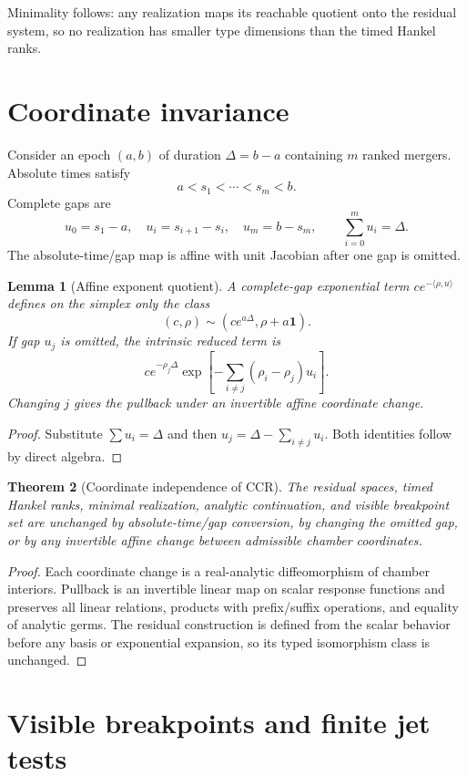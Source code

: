 \documentclass[11pt]{article}
\newtheorem{theorem}{Theorem}[section]
\newtheorem{lemma}[theorem]{Lemma}
\newcommand{\one}{\mathbf 1}
\begin{document}
Minimality follows: any realization maps its reachable quotient onto the residual system, so no realization has smaller type dimensions than the timed Hankel ranks.

\section{Coordinate invariance}

Consider an epoch $(a,b)$ of duration $\Delta=b-a$ containing $m$ ranked mergers.  Absolute times satisfy
\[
a<s_1<\cdots<s_m<b.
\]
Complete gaps are
\[
u_0=s_1-a,\quad u_i=s_{i+1}-s_i,\quad u_m=b-s_m,
\qquad \sum_{i=0}^m u_i=\Delta.
\]
The absolute-time/gap map is affine with unit Jacobian after one gap is omitted.

\begin{lemma}[Affine exponent quotient]
A complete-gap exponential term $ce^{-\langle\rho,u\rangle}$ defines on the simplex only the class
\[
(c,\rho)\sim(ce^{a\Delta},\rho+a\one).
\]
If gap $u_j$ is omitted, the intrinsic reduced term is
\[
ce^{-\rho_j\Delta}\exp\!\left[-\sum_{i\ne j}(\rho_i-\rho_j)u_i\right].
\]
Changing $j$ gives the pullback under an invertible affine coordinate change.
\end{lemma}

\begin{proof}
Substitute $\sum u_i=\Delta$ and then $u_j=\Delta-\sum_{i\ne j}u_i$.  Both identities follow by direct algebra.
\end{proof}

\begin{theorem}[Coordinate independence of CCR]
The residual spaces, timed Hankel ranks, minimal realization, analytic continuation, and visible breakpoint set are unchanged by absolute-time/gap conversion, by changing the omitted gap, or by any invertible affine change between admissible chamber coordinates.
\end{theorem}

\begin{proof}
Each coordinate change is a real-analytic diffeomorphism of chamber interiors.  Pullback is an invertible linear map on scalar response functions and preserves all linear relations, products with prefix/suffix operations, and equality of analytic germs.  The residual construction is defined from the scalar behavior before any basis or exponential expansion, so its typed isomorphism class is unchanged.
\end{proof}

\section{Visible breakpoints and finite jet tests}
\end{document}
